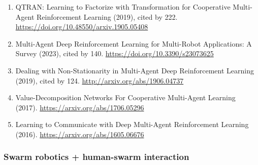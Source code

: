 \documentclass[
]{article}
\begin{document}
\begin{enumerate}
\item
  QTRAN: Learning to Factorize with Transformation for Cooperative
  Multi-Agent Reinforcement Learning (2019), cited by 222.
  \url{https://doi.org/10.48550/arxiv.1905.05408}
\item
  Multi-Agent Deep Reinforcement Learning for Multi-Robot Applications:
  A Survey (2023), cited by 140. \url{https://doi.org/10.3390/s23073625}
\item
  Dealing with Non-Stationarity in Multi-Agent Deep Reinforcement
  Learning (2019), cited by 124. \url{http://arxiv.org/abs/1906.04737}
\item
  Value-Decomposition Networks For Cooperative Multi-Agent Learning
  (2017). \url{https://arxiv.org/abs/1706.05296}
\item
  Learning to Communicate with Deep Multi-Agent Reinforcement Learning
  (2016). \url{https://arxiv.org/abs/1605.06676}
\end{enumerate}

\hypertarget{swarm-robotics-human-swarm-interaction}{%
\subsubsection{Swarm robotics + human-swarm
interaction}\label{swarm-robotics-human-swarm-interaction}}
\end{document}
